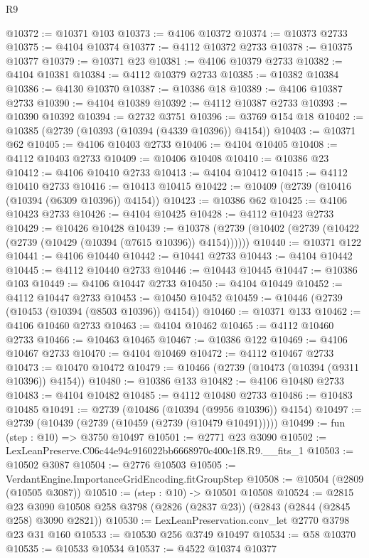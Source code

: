 \begin{lexlean}{R9}
\begin{coremodule}
@10372 := @10371 @103
@10373 := @4106 @10372
@10374 := @10373 @2733
@10375 := @4104 @10374
@10377 := @4112 @10372 @2733
@10378 := @10375 @10377
@10379 := @10371 @23
@10381 := @4106 @10379 @2733
@10382 := @4104 @10381
@10384 := @4112 @10379 @2733
@10385 := @10382 @10384
@10386 := @4130 @10370
@10387 := @10386 @18
@10389 := @4106 @10387 @2733
@10390 := @4104 @10389
@10392 := @4112 @10387 @2733
@10393 := @10390 @10392
@10394 := @2732 @3751
@10396 := @3769 @154 @18
@10402 := @10385 (@2739 (@10393 (@10394 (@4339 @10396)) @4154))
@10403 := @10371 @62
@10405 := @4106 @10403 @2733
@10406 := @4104 @10405
@10408 := @4112 @10403 @2733
@10409 := @10406 @10408
@10410 := @10386 @23
@10412 := @4106 @10410 @2733
@10413 := @4104 @10412
@10415 := @4112 @10410 @2733
@10416 := @10413 @10415
@10422 := @10409 (@2739 (@10416 (@10394 (@6309 @10396)) @4154))
@10423 := @10386 @62
@10425 := @4106 @10423 @2733
@10426 := @4104 @10425
@10428 := @4112 @10423 @2733
@10429 := @10426 @10428
@10439 := @10378 (@2739 (@10402 (@2739 (@10422 (@2739 (@10429 (@10394 (@7615 @10396)) @4154))))))
@10440 := @10371 @122
@10441 := @4106 @10440
@10442 := @10441 @2733
@10443 := @4104 @10442
@10445 := @4112 @10440 @2733
@10446 := @10443 @10445
@10447 := @10386 @103
@10449 := @4106 @10447 @2733
@10450 := @4104 @10449
@10452 := @4112 @10447 @2733
@10453 := @10450 @10452
@10459 := @10446 (@2739 (@10453 (@10394 (@8503 @10396)) @4154))
@10460 := @10371 @133
@10462 := @4106 @10460 @2733
@10463 := @4104 @10462
@10465 := @4112 @10460 @2733
@10466 := @10463 @10465
@10467 := @10386 @122
@10469 := @4106 @10467 @2733
@10470 := @4104 @10469
@10472 := @4112 @10467 @2733
@10473 := @10470 @10472
@10479 := @10466 (@2739 (@10473 (@10394 (@9311 @10396)) @4154))
@10480 := @10386 @133
@10482 := @4106 @10480 @2733
@10483 := @4104 @10482
@10485 := @4112 @10480 @2733
@10486 := @10483 @10485
@10491 := @2739 (@10486 (@10394 (@9956 @10396)) @4154)
@10497 := @2739 (@10439 (@2739 (@10459 (@2739 (@10479 @10491)))))
@10499 := fun (step : @10) => @3750 @10497
@10501 := @2771 @23 @3090
@10502 := LexLeanPreserve.C06c44e94c916022bb6668970c400c1f8.R9.__fits_1
@10503 := @10502 @3087
@10504 := @2776 @10503
@10505 := VerdantEngine.ImportanceGridEncoding.fitGroupStep
@10508 := @10504 (@2809 (@10505 @3087))
@10510 := (step : @10) -> @10501 @10508
@10524 := @2815
    @23
    @3090
    @10508
    @258
    @3798
    (@2826 (@2837 @23))
    (@2843 (@2844 (@2845 @258) @3090 @2821))
@10530 := LexLeanPreservation.conv_let @2770 @3798 @23 @31 @160
@10533 := @10530 @256 @3749 @10497
@10534 := @58 @10370
@10535 := @10533 @10534
@10537 := @4522 @10374 @10377

\end{coremodule}
\end{lexlean}

